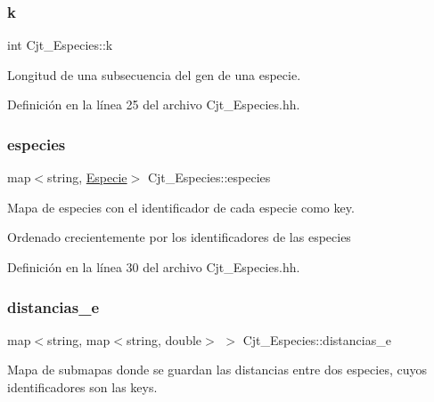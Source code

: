 \subsubsection{\texorpdfstring{k}{k}}
{\footnotesize\ttfamily int Cjt\+\_\+\+Especies\+::k\hspace{0.3cm}{\ttfamily [private]}}



Longitud de una subsecuencia del gen de una especie. 



Definición en la línea 25 del archivo Cjt\+\_\+\+Especies.\+hh.

\mbox{\label{class_cjt___especies_a8f319699bd2e8a42b85ec47b67c17563}} 
\subsubsection{\texorpdfstring{especies}{especies}}
{\footnotesize\ttfamily map$<$string, \hyperlink{class_especie}{Especie}$>$ Cjt\+\_\+\+Especies\+::especies\hspace{0.3cm}{\ttfamily [private]}}



Mapa de especies con el identificador de cada especie como key. 

Ordenado crecientemente por los identificadores de las especies 

Definición en la línea 30 del archivo Cjt\+\_\+\+Especies.\+hh.

\mbox{\label{class_cjt___especies_ad1c8837b7e76b9a7610b65209aa7f5e9}} 
\subsubsection{\texorpdfstring{distancias\+\_\+e}{distancias\_e}}
{\footnotesize\ttfamily map$<$string, map$<$string, double$>$ $>$ Cjt\+\_\+\+Especies\+::distancias\+\_\+e\hspace{0.3cm}{\ttfamily [private]}}



Mapa de submapas donde se guardan las distancias entre dos especies, cuyos identificadores son las keys. 

